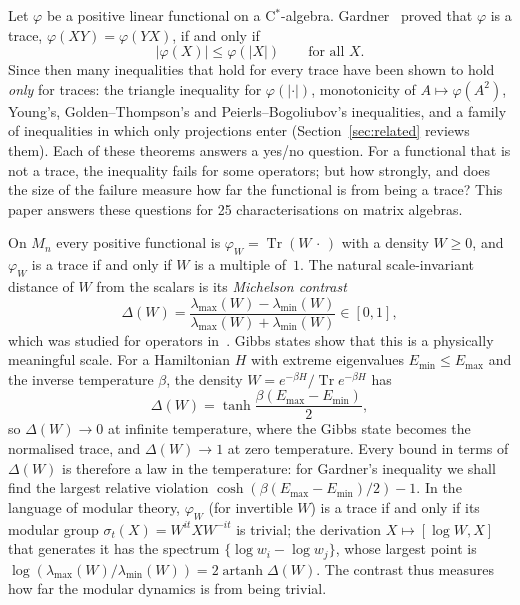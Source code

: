 \documentclass[11pt]{article}
\DeclareMathOperator{\Tr}{Tr}
\theoremstyle{plain}
\theoremstyle{definition}
\theoremstyle{remark}
\begin{document}
Let $\varphi$ be a positive linear functional on a C$^*$-algebra. Gardner~\cite{gardner1979} proved that $\varphi$ is
a trace, $\varphi(XY)=\varphi(YX)$, if and only if
\begin{equation}\label{eq:gardner}
  |\varphi(X)|\le\varphi(|X|)\qquad\text{for all }X .
\end{equation}
Since then many inequalities that hold for every trace have been shown to hold \emph{only} for traces: the triangle
inequality for $\varphi(|\cdot|)$, monotonicity of $A\mapsto\varphi(A^2)$, Young's, Golden--Thompson's and
Peierls--Bogoliubov's inequalities, and a family of inequalities in which only projections enter
(Section~\ref{sec:related} reviews them). Each of these theorems answers a yes/no question. For a functional that is
not a trace, the inequality fails for some operators; but how strongly, and does the size of the failure measure how
far the functional is from being a trace? This paper answers these questions for 25 characterisations on matrix
algebras.

On $M_n$ every positive functional is $\varphi_W=\Tr(W\,\cdot\,)$ with a density $W\ge0$, and $\varphi_W$ is a trace
if and only if $W$ is a multiple of~$1$. The natural scale-invariant distance of $W$ from the scalars is its
\emph{Michelson contrast}
\[
  \Delta(W)=\frac{\lambda_{\max}(W)-\lambda_{\min}(W)}{\lambda_{\max}(W)+\lambda_{\min}(W)}\in[0,1],
\]
which was studied for operators in~\cite{abed2024}. Gibbs states show that this is a physically meaningful scale. For
a Hamiltonian $H$ with extreme eigenvalues $E_{\min}\le E_{\max}$ and the inverse temperature $\beta$, the density
$W=e^{-\beta H}/\Tr e^{-\beta H}$ has
\[
  \Delta(W)=\tanh\frac{\beta(E_{\max}-E_{\min})}2 ,
\]
so $\Delta(W)\to0$ at infinite temperature, where the Gibbs state becomes the normalised trace, and $\Delta(W)\to1$ at
zero temperature. Every bound in terms of $\Delta(W)$ is therefore a law in the temperature: for Gardner's inequality we
shall find the largest relative violation $\cosh(\beta(E_{\max}-E_{\min})/2)-1$. In the language of modular theory,
$\varphi_W$ (for invertible $W$) is a trace if and only if its modular group $\sigma_t(X)=W^{it}XW^{-it}$ is trivial;
the derivation $X\mapsto[\log W,X]$ that generates it has the spectrum $\{\log w_i-\log w_j\}$, whose largest point is
$\log(\lambda_{\max}(W)/\lambda_{\min}(W))=2\operatorname{artanh}\Delta(W)$. The contrast thus measures how far the
modular dynamics is from being trivial.
\end{document}
